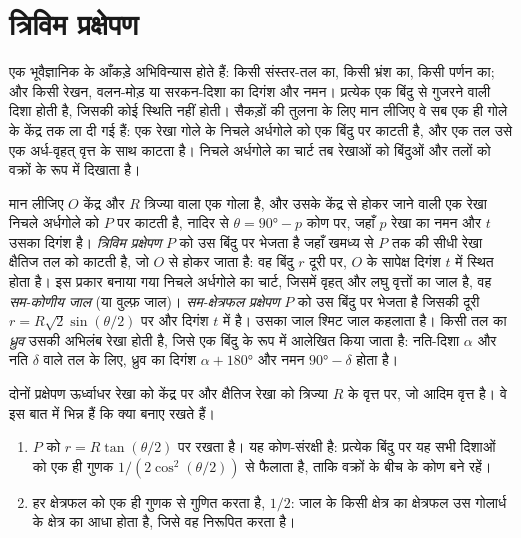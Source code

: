 \section{त्रिविम प्रक्षेपण}\label{sec:b3:structural-analysis:stereo}

एक भूवैज्ञानिक के आँकड़े अभिविन्यास होते हैं: किसी संस्तर-तल का, किसी
भ्रंश का, किसी पर्णन का; और किसी रेखन, वलन-मोड़ या सरकन-दिशा का
दिगंश और नमन। प्रत्येक एक बिंदु से गुजरने वाली दिशा होती है, जिसकी कोई स्थिति नहीं होती। सैकड़ों की तुलना के लिए
मान लीजिए वे सब एक ही गोले के केंद्र तक ला दी गई हैं:
एक रेखा गोले के निचले अर्धगोले को एक बिंदु पर काटती है, और एक तल उसे
एक अर्ध-वृहत् वृत्त के साथ काटता है। निचले अर्धगोले का चार्ट तब रेखाओं को
बिंदुओं और तलों को वक्रों के रूप में दिखाता है।

\begin{definition}[त्रिविम प्रक्षेपण, सम-कोणीय जाल, सम-क्षेत्रफल प्रक्षेपण, ध्रुव]\label{def:b3:structural-analysis:stereo}
मान लीजिए $O$ केंद्र और $R$ त्रिज्या वाला एक गोला है, और उसके केंद्र से होकर जाने वाली एक रेखा निचले
अर्धगोले को $P$ पर काटती है, नादिर से $\theta = \ang{90} - p$ कोण पर, जहाँ
$p$ रेखा का नमन और $t$ उसका दिगंश है। \emph{त्रिविम प्रक्षेपण} $P$ को उस बिंदु पर भेजता है
जहाँ खमध्य से $P$ तक की सीधी रेखा
क्षैतिज तल को काटती है, जो $O$ से होकर
जाता है: वह बिंदु $r$ दूरी पर, $O$ के सापेक्ष दिगंश $t$ में स्थित होता है। इस प्रकार
बनाया गया निचले अर्धगोले का चार्ट, जिसमें वृहत् और
लघु वृत्तों का जाल है, वह \emph{सम-कोणीय जाल} (या
वुल्फ़ जाल)। \emph{सम-क्षेत्रफल प्रक्षेपण}
$P$ को उस बिंदु पर भेजता है जिसकी दूरी $r =
R\sqrt2\sin(\theta/2)$ पर और दिगंश $t$ में है। उसका जाल श्मिट जाल कहलाता है।
किसी तल का \emph{ध्रुव} उसकी अभिलंब रेखा होती है, जिसे
एक बिंदु के रूप में आलेखित किया जाता है: नति-दिशा $\alpha$ और नति $\delta$ वाले तल के लिए,
ध्रुव का दिगंश $\alpha + \ang{180}$ और नमन $\ang{90} - \delta$ होता है।
\end{definition}

दोनों प्रक्षेपण ऊर्ध्वाधर रेखा को केंद्र पर और क्षैतिज रेखा को
त्रिज्या $R$ के वृत्त पर, जो आदिम वृत्त है। वे इस बात में भिन्न हैं कि क्या बनाए रखते हैं।

\begin{theorem}[दोनों प्रक्षेपण]\label{thm:b3:structural-analysis:projections}
\begin{enumerate}[label=(\alph*)]
  \item {} $P$ को $r = R\tan(\theta/2)$ पर रखता है। यह
        कोण-संरक्षी है: प्रत्येक बिंदु पर यह सभी दिशाओं को एक ही गुणक
        $1/(2\cos^2(\theta/2))$ से फैलाता है, ताकि वक्रों के बीच के
        कोण बने रहें।
  \item {} हर क्षेत्रफल को एक ही गुणक से गुणित करता है,
        $1/2$: जाल के किसी क्षेत्र का क्षेत्रफल उस गोलार्ध के क्षेत्र का आधा होता है,
        जिसे वह निरूपित करता है।
\end{enumerate}
\end{theorem}

